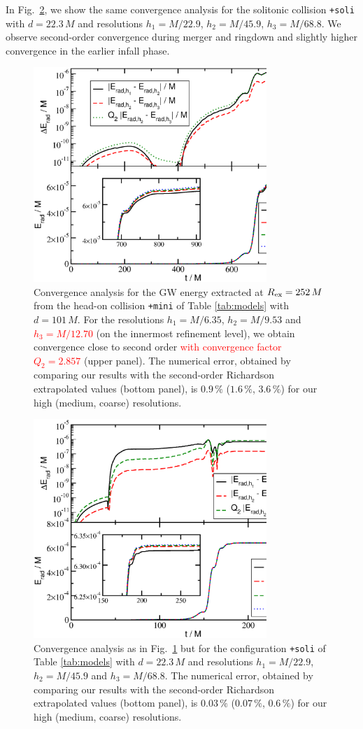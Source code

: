 \documentclass[]{iopart}
\newcommand{\new}[1]{\textcolor{red}{#1}}
\begin{document}
In Fig.~\ref{fig:conv_tsBS_Erad}, we show the same convergence
analysis for the solitonic collision {\tt +soli} with $d=22.3\,M$
and resolutions $h_1=M/22.9$, $h_2=M/45.9$, $h_3=M/68.8$. We observe
second-order convergence during merger and ringdown and slightly
higher convergence in the earlier infall phase.
%
\begin{figure}[t]
    \centering
    \includegraphics[width=250pt]{conv_tmBS_Erad.eps}
    \caption{
    Convergence analysis for the GW energy extracted at $R_{\rm
    ex}=252\,M$ from the head-on collision {\tt +mini} of Table
    \ref{tab:models} with $d=101\,M$. For the resolutions $h_1=M/6.35$,
    $h_2=M/9.53$ and \new{$h_3=M/12.70$} (on the innermost refinement level),
    we obtain convergence close to second order \new{with convergence factor
    $Q_2=2.857$} (upper panel). The
    numerical error, obtained by comparing our results with the
    second-order Richardson extrapolated values (bottom panel), is
    $0.9\,\%$ ($1.6\,\%$, $3.6\,\%$) for our high (medium, coarse)
    resolutions.
    }
    \label{fig:conv_tmBS_Erad}
\end{figure}
%
%
\begin{figure}[t]
    \centering
    \includegraphics[width=250pt]{conv_tsBS_Erad.eps}
    \caption{
    Convergence analysis as in Fig.~\ref{fig:conv_tmBS_Erad} but
    for the configuration {\tt +soli} of Table \ref{tab:models}
    with $d=22.3\,M$ and resolutions $h_1=M/22.9$, $h_2=M/45.9$ and
    $h_3=M/68.8$.  The numerical error, obtained by comparing our
    results with the second-order Richardson extrapolated values
    (bottom panel), is $0.03\,\%$ ($0.07\,\%$, $0.6\,\%$) for our
    high (medium, coarse) resolutions.
    }
    \label{fig:conv_tsBS_Erad}
\end{figure}
\end{document}
